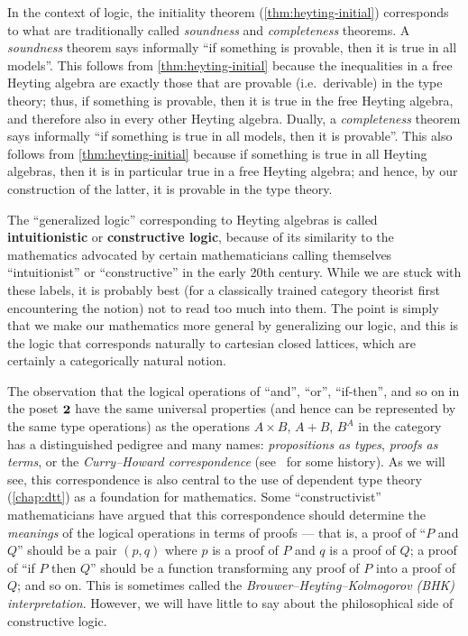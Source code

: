 \begin{rmk}\label{rmk:soundness-completeness}
  In the context of logic, the initiality theorem (\cref{thm:heyting-initial}) corresponds to what are traditionally called \emph{soundness} and \emph{completeness} theorems.
  A \emph{soundness} theorem says informally ``if something is provable, then it is true in all models''.
  This follows from \cref{thm:heyting-initial} because the inequalities in a free Heyting algebra are exactly those that are provable (i.e.\ derivable) in the type theory; thus, if something is provable, then it is true in the free Heyting algebra, and therefore also in every other Heyting algebra.
  Dually, a \emph{completeness} theorem says informally ``if something is true in all models, then it is provable''.
  This also follows from \cref{thm:heyting-initial} because if something is true in all Heyting algebras, then it is in particular true in a free Heyting algebra; and hence, by our construction of the latter, it is provable in the type theory.
\end{rmk}

The ``generalized logic'' corresponding to Heyting algebras is called \textbf{intuitionistic} or \textbf{constructive logic}, because of its similarity to the mathematics advocated by certain mathematicians calling themselves ``intuitionist'' or ``constructive'' in the early 20th century.
While we are stuck with these labels, it is probably best (for a classically trained category theorist first encountering the notion) not to read too much into them.
The point is simply that we make our mathematics more general by generalizing our logic, and this is the logic that corresponds naturally to cartesian closed lattices, which are certainly a categorically natural notion.

The observation that the logical operations of ``and'', ``or'', ``if-then'', and so on in the poset $\mathbf{2}$ have the same universal properties (and hence can be represented by the same type operations) as the operations $A\times B$, $A+B$, $B^A$ in the category \bSet has a distinguished pedigree and many names: \emph{propositions as types}, \emph{proofs as terms}, or the \emph{Curry--Howard correspondence} (see~\cite{wadler:pat} for some history).
As we will see, this correspondence is also central to the use of dependent type theory (\cref{chap:dtt}) as a foundation for mathematics.
Some ``constructivist'' mathematicians have argued that this correspondence should determine the \emph{meanings} of the logical operations in terms of proofs --- that is, a proof of ``$P$ and $Q$'' should be a pair $(p,q)$ where $p$ is a proof of $P$ and $q$ is a proof of $Q$; a proof of ``if $P$ then $Q$'' should be a function transforming any proof of $P$ into a proof of $Q$; and so on.
This is sometimes called the \emph{Brouwer--Heyting--Kolmogorov (BHK) interpretation}.
However, we will have little to say about the philosophical side of constructive logic.

